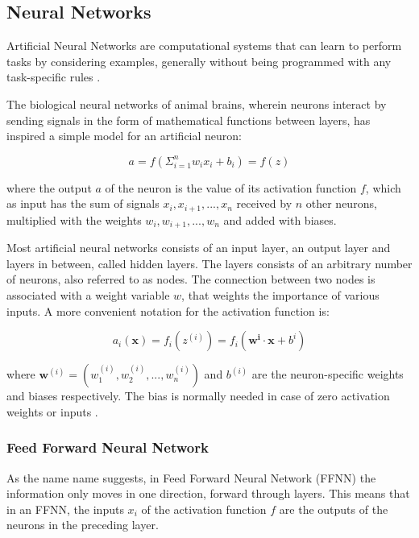 \documentclass[a4paper, UKenglish, 11pt]{uiomaster}
\begin{document}
\subsection*{Neural  Networks}
Artificial Neural Networks are computational systems that can learn to perform tasks by considering examples, generally without being programmed with any task-specific rules \cite{101}.

The biological neural networks of animal brains, wherein neurons interact by sending signals in the form of mathematical functions between layers, has inspired a simple model for an artificial neuron:

\begin{equation*}
    a = f \left( \Sigma_{i=1}^n w_ix_i + b_i\right ) = f(z)
    \label{eq:NN}
\end{equation*}

where the output $a$ of the neuron is the value of its activation function $f$, which as input has the sum of signals $x_i, x_{i+1}, ..., x_n$ received by $n$ other neurons, multiplied with the weights $w_i, w_{i+1}, ..., w_n$ and added with biases.

Most artificial neural networks consists of an input layer, an output layer and layers in between, called hidden layers. The layers consists of an arbitrary number of neurons, also referred to as nodes. The connection between two nodes is associated with a weight variable $w$, that weights the importance of various inputs. A more convenient notation for the activation function is:

\begin{equation}
    a_i(\boldsymbol{x}) = f_i(z^{(i)}) = f_i(\boldsymbol{w^{i}}\cdot \boldsymbol{x} + b^{i})
\label{eq:NN_vec}
\end{equation}

where $\boldsymbol{w}^{(i)} = (w_1^{(i)}, w_2^{(i)}, ..., w_n^{(i)})$ and $b^{(i)}$ are the neuron-specific weights and biases respectively. The bias is normally needed in case of zero activation weights or inputs \cite{101}.

\subsubsection*{Feed Forward Neural Network}

As the name name suggests, in Feed Forward Neural Network (FFNN) the information only moves in one direction, forward through layers. This means that in an FFNN, the inputs $x_i$ of the activation function $f$ are the outputs of the neurons in the preceding layer.
\end{document}

